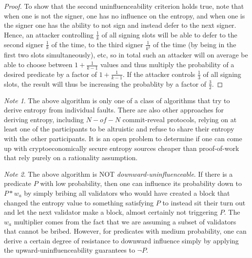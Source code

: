 \documentclass[11pt,a4paper]{report}
\theoremstyle{plain}
\theoremstyle{definition}
\theoremstyle{remark}
\newtheorem*{note}{Note}
\begin{document}
\begin{proof}
To show that the second uninfluenceability criterion holds true, note that when one is not the signer, one has no influence on the entropy, and when one is the signer one has the ability to not sign and instead defer to the next signer. Hence, an attacker controlling $\frac{1}{k}$ of all signing slots will be able to defer to the second signer $\frac{1}{k}$ of the time, to the third signer $\frac{1}{k^2}$ of the time (by being in the first two slots simultaneously), etc, so in total such an attacker will on average be able to choose between $1 + \frac{1}{k-1}$ values and thus multiply the probability of a desired predicate by a factor of $1 + \frac{1}{k-1}$. If the attacker controls $\frac{1}{3}$ of all signing slots, the result will thus be increasing the probablity by a factor of $\frac{3}{2}$.
\end{proof}

\begin{note}
The above algorithm is only one of a class of algorithms that try to derive entropy from individual faults. There are also other approaches for deriving entropy, including $N-of-N$ commit-reveal protocols, relying on at least one of the participants to be altruistic and refuse to share their entropy with the other participants. It is an open problem to determine if one can come up with cryptoeconomically secure entropy sources cheaper than proof-of-work that rely purely on a rationality assumption.
\end{note}

\begin{note}
The above algorithm is NOT \emph{downward-uninfluenceable}. If there is a predicate $P$ with low probability, then one can influence its probability down to $P * w_a$ by simply bribing all validators who would have created a block that changed the entropy value to something satisfying $P$ to instead sit their turn out and let the next validator make a block, almost certainly not triggering $P$. The $w_a$ multiplier comes from the fact that we are assuming a subset of validators that cannot be bribed. However, for predicates with medium probability, one can derive a certain degree of resistance to downward influence simply by applying the upward-uninfluenceability guarantees to $\neg P$.
\end{note}
\end{document}
